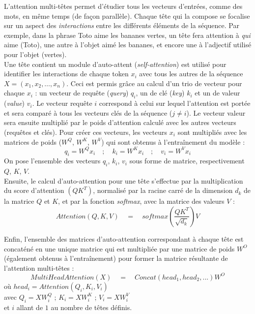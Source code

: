 \documentclass[12pt, twoside]{report}
\begin{document}
L'attention multi-têtes permet d'étudier tous les vecteurs d'entrées, comme des mots, en même temps (de façon parallèle). Chaque tête qui la compose se focalise sur un aspect des \textit{interactions} entre les différents éléments de la séquence. Par exemple, dans la phrase \og Toto aime les bananes vertes\fg{}, un tête fera attention à \textit{qui} aime (\og Toto\fg{}), une autre à l'objet aimé \og les bananes\fg{}, et encore une à l'adjectif utilisé pour l'objet (\og vertes\fg{}).\\ 

Une tête contient un module d'auto-attent (\textit{self-attention}) est utilisé pour identifier les interactions de chaque \gls{token} $x_i$ avec tous les autres de la séquence $X=(x_1, x_2, \dots, x_n)$. Ceci est permis grâce au calcul d'un trio de vecteur pour chaque $x_i$ : un vecteur de requête (\textit{query}) $q_i$, un de clé (\textit{key}) $k_i$ et un de valeur (\textit{value}) $v_i$. Le vecteur requête $i$ correspond à celui sur lequel l'attention est portée et sera comparé à tous les vecteurs clés de la séquence ($j\ne i$). Le vecteur valeur sera ensuite multiplié par le poids d'attention calculé avec les autres vecteurs (requêtes et clés). Pour créer ces vecteurs, les vecteurs $x_i$ sont multipliés avec les matrices de poids ($W^Q$, $W^K$, $W^V$) qui sont obtenus à l'entraînement du modèle :
\begin{equation}
    q_i = W^Q x_i \quad ; \quad k_i = W^K x_i \quad ; \quad v_i = W^V x_i
\end{equation}
On pose l'ensemble des vecteurs $q_i$, $k_i$, $v_i$ sous forme de matrice, respectivement $Q$, $K$, $V$.\\

Ensuite, le calcul d'auto-attention pour une tête s'effectue par la multiplication du score d'attention $(QK^T)$, normalisé par la racine carré de la dimension $d_k$ de la matrice $Q$ et $K$, et par la fonction \textit{softmax}, avec la matrice des valeurs $V$ :
\begin{equation}
    Attention(Q, K, V) \quad  = \quad  softmax(\frac{QK^T}{\sqrt{d_k}})V
\end{equation}

Enfin, l'ensemble des matrices d'auto-attention correspondant à chaque tête est concaténé en une unique matrice qui est multipliée par une matrice de poids $W^O$ (également obtenus à l'entraînement) pour former la matrice résultante de l'attention multi-têtes :
\begin{equation}
    MultiHeadAttention(X) \quad = \quad Concat(head_1, head_2, ...)W^O
\end{equation}
\hfill où $head_i = Attention(Q_i, K_i, V_i)$\\
\vspace{2pt}
\hfill avec $Q_i = XW^Q_i$ ; $K_i = XW^K_i$ ; $V_i = XW^V_i$\\
\vspace{2pt}
\hfill et $i$ allant de $1$ au nombre de têtes définis.\\
\end{document}
